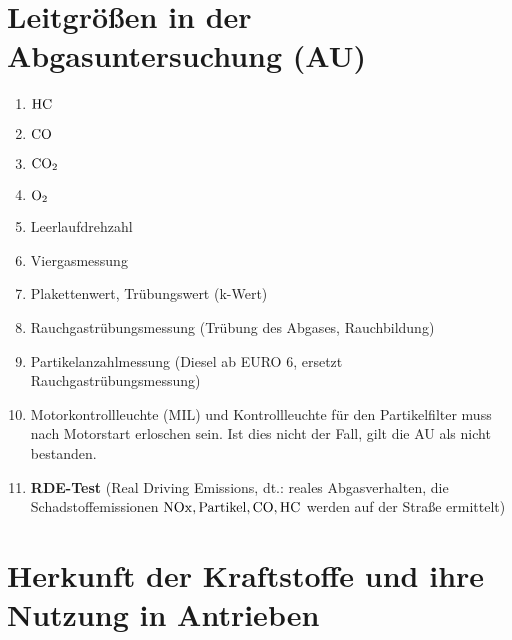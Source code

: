 \section{Leitgrößen in der Abgasuntersuchung
(AU)}\label{leitgroessen-in-der-abgasuntersuchung-au}

\begin{enumerate}
\item
  $\ce{HC}$
\item
  $\ce{CO}$
\item
  $\ce{CO2}$
\item
  $\ce{O2}$
\item
  Leerlaufdrehzahl
\item
  Viergasmessung
\item
  Plakettenwert, Trübungswert (k-Wert)
\item
  Rauchgastrübungsmessung (Trübung des Abgases, Rauchbildung)
\item
  Partikelanzahlmessung (Diesel ab EURO 6, ersetzt
  Rauchgastrübungsmessung)
\item
  Motorkontrollleuchte (MIL) und Kontrollleuchte für den Partikelfilter
  muss nach Motorstart erloschen sein. Ist dies nicht der Fall, gilt die
  AU als nicht bestanden.
\item
  \textbf{RDE-Test} (Real Driving Emissions, dt.: reales Abgasverhalten,
  die Schadstoffemissionen $\ce{NOx, Partikel, CO, HC}$ werden auf der
  Straße ermittelt)
\end{enumerate}

\section{Herkunft der Kraftstoffe und ihre Nutzung in
Antrieben}\label{herkunft-der-kraftstoffe-und-ihre-nutzung-in-antrieben}

